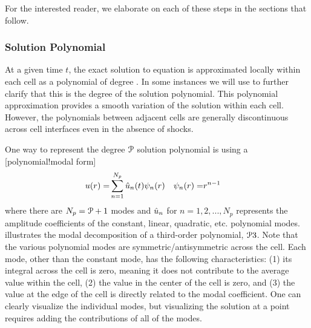 
For the interested reader, we elaborate on each of these steps
in the sections that follow.


\subsubsection{Solution Polynomial}
\label{SEC:Intro:FR:Polynomial}


At a given time $t$, the exact solution to equation  is
approximated locally within each cell as a polynomial of degree \PO.
%
In some instances we will use  to further clarify that this is the degree
of the solution polynomial.
%
This polynomial approximation provides a smooth variation of the solution within
each cell.
%
However, the polynomials between adjacent cells are generally discontinuous
across cell interfaces even in the absence of shocks.
 

One way to represent the degree $\PO$ solution polynomial is using a
[polynomial!modal form]
\begin{align}
  \label{EQN:Modal_Form}
       u (r) =& \sum_{n=1}^{N_p} \uModal[n] (t) \psi_n (r)
& \psi_n (r) =& r^{n-1}
\end{align}
where there are $N_p=\PO+1$ modes and $\uModal[n]$ for $n=1,2,...,N_p$
represents the amplitude coefficients of the constant, linear, quadratic,
etc. polynomial modes.
%
 illustrates the modal decomposition
of a third-order polynomial, $\PO[3]$. Note that the various polynomial modes
are symmetric\slash antisymmetric across the cell.
%
Each mode, other than the constant mode, has the following characteristics:
(1) its integral across the cell is zero, meaning it does not contribute
to the average value within the cell,
(2) the value in the center of the cell is zero, and
(3) the value at the edge of the cell is directly related to the modal
coefficient.
%
%
One can clearly visualize the individual modes, but visualizing the
solution at a point requires adding the contributions of all of the modes.

